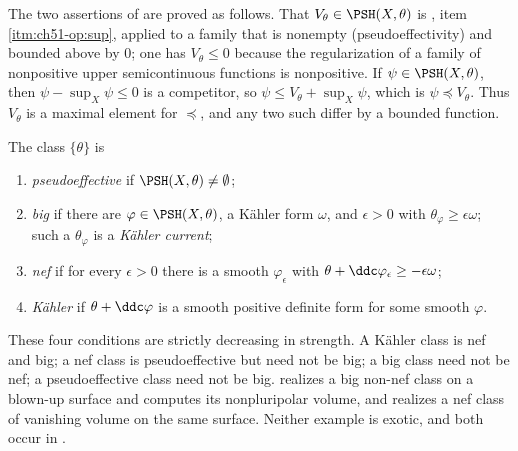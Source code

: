 The two assertions of  are proved as
follows.  That \(V_\theta\in\PSH(X,\theta)\) is
, item \cref{itm:ch51-op:sup}, applied to a
family that is nonempty (pseudoeffectivity) and bounded above by \(0\); one
has \(V_\theta\leq0\) because the regularization of a family of
nonpositive upper semicontinuous functions is nonpositive.  If
\(\psi\in\PSH(X,\theta)\), then \(\psi-\sup_X\psi\leq0\) is a competitor,
so \(\psi\leq V_\theta+\sup_X\psi\), which is
\(\psi\preceq V_\theta\).  Thus \(V_\theta\) is a maximal element for
\(\preceq\), and any two such differ by a bounded function.

\begin{definition}
\label{def:ch51-positivity}
The class \(\{\theta\}\) is
\begin{enumerate}
\item \emph{pseudoeffective} if \(\PSH(X,\theta)\neq\emptyset\);
\item \emph{big} if there are \(\varphi\in\PSH(X,\theta)\), a K\"ahler
      form \(\omega\), and \(\epsilon>0\) with
      \(\theta_\varphi\geq\epsilon\omega\); such a
      \(\theta_\varphi\) is a \emph{K\"ahler current};
\item \emph{nef} if for every \(\epsilon>0\) there is a smooth
      \(\varphi_\epsilon\) with
      \(\theta+\ddc\varphi_\epsilon\geq-\epsilon\omega\);
\item \emph{K\"ahler} if \(\theta+\ddc\varphi\) is a smooth positive
      definite form for some smooth \(\varphi\).
\end{enumerate}
\end{definition}

These four conditions are strictly decreasing in strength.  A K\"ahler
class is nef and big; a nef class is pseudoeffective but need not be big;
a big class need not be nef; a pseudoeffective class need not be big.
 realizes a big non-nef class on a blown-up
surface and computes its nonpluripolar volume, and
 realizes a nef class of vanishing volume on
the same surface.  Neither example is exotic, and both occur in
.

